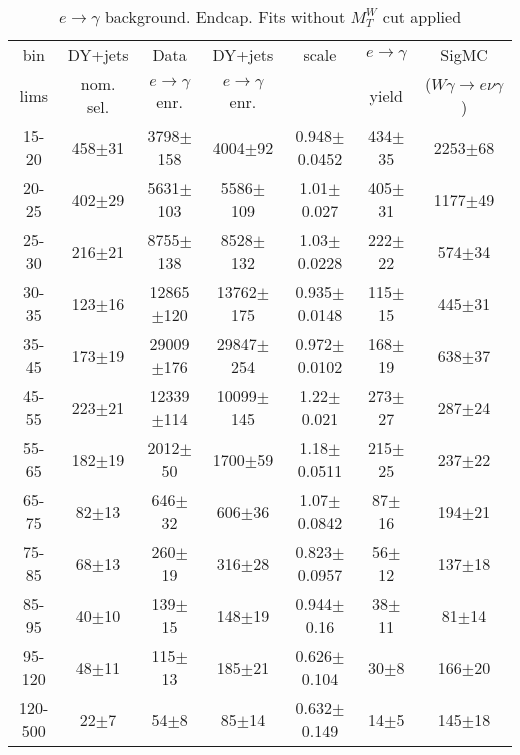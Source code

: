 \begin{table}[h]
  \scriptsize
  \begin{center}
  \caption{$e\rightarrow\gamma$ background. Endcap. Fits without $M_T^W$ cut applied }  
  \begin{tabular}{|c|c|c|c|c|c|c|}
 bin  & DY+jets    & Data                      & DY+jets & scale & $e\rightarrow\gamma$ & SigMC\\ 
 lims & nom. sel. & $e\rightarrow\gamma$ enr. & $e\rightarrow\gamma$ enr. & & yield & ($W\gamma\rightarrow e\nu\gamma$)\\ \hline
15-20 & 458$\pm$31 & 3798$\pm$158 & 4004$\pm$92 & 0.948$\pm$0.0452& 434$\pm$35& 2253$\pm$68 \\ \hline
20-25 & 402$\pm$29 & 5631$\pm$103 & 5586$\pm$109 & 1.01$\pm$0.027& 405$\pm$31& 1177$\pm$49 \\ \hline
25-30 & 216$\pm$21 & 8755$\pm$138 & 8528$\pm$132 & 1.03$\pm$0.0228& 222$\pm$22& 574$\pm$34 \\ \hline
30-35 & 123$\pm$16 & 12865$\pm$120 & 13762$\pm$175 & 0.935$\pm$0.0148& 115$\pm$15& 445$\pm$31 \\ \hline
35-45 & 173$\pm$19 & 29009$\pm$176 & 29847$\pm$254 & 0.972$\pm$0.0102& 168$\pm$19& 638$\pm$37 \\ \hline
45-55 & 223$\pm$21 & 12339$\pm$114 & 10099$\pm$145 & 1.22$\pm$0.021& 273$\pm$27& 287$\pm$24 \\ \hline
55-65 & 182$\pm$19 & 2012$\pm$50 & 1700$\pm$59 & 1.18$\pm$0.0511& 215$\pm$25& 237$\pm$22 \\ \hline
65-75 & 82$\pm$13 & 646$\pm$32 & 606$\pm$36 & 1.07$\pm$0.0842& 87$\pm$16& 194$\pm$21 \\ \hline
75-85 & 68$\pm$13 & 260$\pm$19 & 316$\pm$28 & 0.823$\pm$0.0957& 56$\pm$12& 137$\pm$18 \\ \hline
85-95 & 40$\pm$10 & 139$\pm$15 & 148$\pm$19 & 0.944$\pm$0.16& 38$\pm$11& 81$\pm$14 \\ \hline
95-120 & 48$\pm$11 & 115$\pm$13 & 185$\pm$21 & 0.626$\pm$0.104& 30$\pm$8& 166$\pm$20 \\ \hline
120-500 & 22$\pm$7 & 54$\pm$8 & 85$\pm$14 & 0.632$\pm$0.149& 14$\pm$5& 145$\pm$18 \\ \hline
  \end{tabular}
  \label{tab:EtoGAMMA_NoWMtCut_1}
  \end{center}
\end{table}
